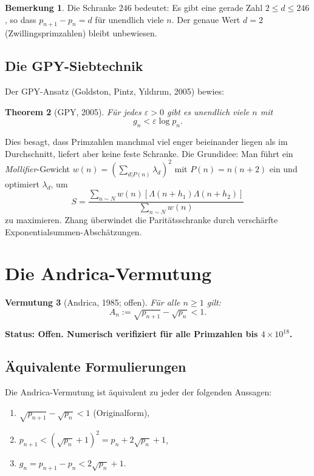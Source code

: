 \documentclass[12pt,a4paper]{amsart}
\newtheorem{theorem}{Theorem}[section]
\newtheorem{vermutung}[theorem]{Vermutung}
\theoremstyle{definition}
\newtheorem{bemerkung}[theorem]{Bemerkung}
\begin{document}
\begin{bemerkung}
Die Schranke $246$ bedeutet: Es gibt eine gerade Zahl $2 \leq d \leq 246$, so
dass $p_{n+1} - p_n = d$ f\"{u}r unendlich viele $n$. Der genaue Wert $d = 2$
(Zwillingsprimzahlen) bleibt unbewiesen.
\end{bemerkung}

\subsection{Die GPY-Siebtechnik}

Der GPY-Ansatz (Goldston, Pintz, Y{\i}ld{\i}r{\i}m, 2005) bewies:
\begin{theorem}[GPY, 2005]
F\"{u}r jedes $\varepsilon > 0$ gibt es unendlich viele $n$ mit
\[
  g_n < \varepsilon \log p_n.
\]
\end{theorem}

Dies besagt, dass Primzahlen manchmal viel enger beieinander liegen als im
Durchschnitt, liefert aber keine feste Schranke. Die Grundidee: Man f\"{u}hrt ein
\emph{Mollifier}-Gewicht $w(n) = (\sum_{d | P(n)} \lambda_d)^2$ mit
$P(n) = n(n+2)$ ein und optimiert $\lambda_d$, um
\[
  S = \frac{\sum_{n \sim N} w(n)[\Lambda(n+h_1)\Lambda(n+h_2)]}{\sum_{n \sim N} w(n)}
\]
zu maximieren. Zhang \"{u}berwindet die Parit\"{a}tsschranke durch versch\"{a}rfte
Exponentialsummen-Absch\"{a}tzungen.

\section{Die Andrica-Vermutung}

\begin{vermutung}[Andrica, 1985; offen]
\label{verm:andrica}
F\"{u}r alle $n \geq 1$ gilt:
\[
  A_n := \sqrt{p_{n+1}} - \sqrt{p_n} < 1.
\]
\end{vermutung}

\textbf{Status: Offen. Numerisch verifiziert f\"{u}r alle Primzahlen bis
$4 \times 10^{18}$.}

\subsection{\"{A}quivalente Formulierungen}

Die Andrica-Vermutung ist \"{a}quivalent zu jeder der folgenden Aussagen:
\begin{enumerate}[label=(\roman*)]
  \item $\sqrt{p_{n+1}} - \sqrt{p_n} < 1$ (Originalform),
  \item $p_{n+1} < (\sqrt{p_n} + 1)^2 = p_n + 2\sqrt{p_n} + 1$,
  \item $g_n = p_{n+1} - p_n < 2\sqrt{p_n} + 1$.
\end{enumerate}
\end{document}
